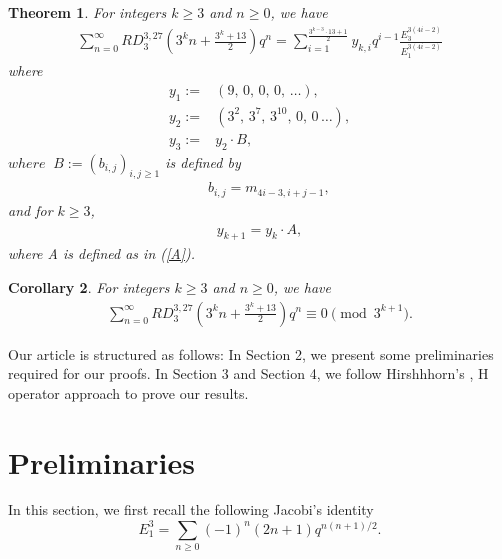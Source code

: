 \documentclass[11pt,a4paper]{article}
\numberwithin{equation}{section}
\theoremstyle{plain}
\newtheorem{theorem}{Theorem}[section]
\newtheorem{corollary}[theorem]{Corollary}
\begin{document}
\begin{theorem}\label{T5}
	For integers $k \geq 3$ and $n \geq 0$, we have
	\begin{align*}
		\sum_{n=0}^{\infty}RD_3^{3,27}\left(3^kn+\frac{3^k+13}{2}\right)q^n=\sum_{i=1}^{\frac{3^{k-3}\cdot13+1}{2}}y_{k,i}q^{i-1}\frac{E_3^{3(4i-2)}}{E_1^{3(4i-2)}}
	\end{align*}
	where
	\begin{align*}
		y_1
		:=& (9,\,0,\,0,\,0,\,\ldots),\\
		y_2 :=& (3^2,\,3^7,\,3^{10},\,0,\,0\,\ldots),\\
		y_3:=&y_2\cdot B, 
	\end{align*}
	$ where \;\;B:=(b_{i,j})_{i,j\geq1}$ is defined by
		\begin{align*}
			\,\,\,\,\,\,\,\,b_{i,j}=m_{4i-3,i+j-1},
		\end{align*}
	and for $k\geq3$,
	\begin{align*}
		y_{k+1}=y_k\cdot A,
	\end{align*}
	where A is defined as in (\ref{A}).
\end{theorem}
\begin{corollary}\label{coro3}
		For integers $k \geq 3$ and $n \geq 0$, we have
	\begin{align*}
		\sum_{n=0}^{\infty}RD_3^{3,27}\left(3^kn+\frac{3^k+13}{2}\right)q^n\equiv0\pmod{3^{k+1}}.
	\end{align*}
\end{corollary}
	
	
	\noindent Our article is structured as follows: In Section 2, we present some preliminaries required for our proofs. In Section 3 and Section 4, we follow Hirshhhorn's \cite{hirsh}, H operator approach to prove our results. %
	\section{Preliminaries}
\noindent In this section, we first recall the following Jacobi's identity
\begin{equation*}
	E_1^3 = \sum_{n \geq 0} (-1)^n (2n+1) q^{n(n+1)/2}. 
\end{equation*}
\end{document}
